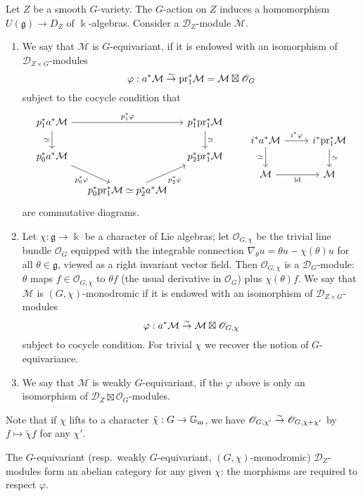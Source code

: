 \documentclass[12pt, a3paper, openany]{book}
\begin{document}
\begin{Definition}{}{}
	Let $Z$ be a smooth $G$-variety. The $G$-action on $Z$ induces a homomorphism $U(\mathfrak{g}) \to D_Z$ of $\Bbbk$-algebras. Consider a $\mathscr{D}_Z$-module $\mathcal{M}$.
	\begin{enumerate}
		\item We say that $\mathcal{M}$ is $G$-equivariant, if it is endowed with an isomorphism of $\mathscr{D}_{Z \times G}$-modules
		\[ \varphi: a^* \mathcal{M} \stackrel{\sim}{\rightarrow} \mathrm{pr}_1^* \mathcal{M} =  \mathcal{M} \boxtimes \mathscr{O}_G \]
		subject to the cocycle condition that
		\[\begin{tikzcd}[column sep=small]
			p_1^* a^* \mathcal{M} \arrow[rr, "{p_1^* \varphi}"] \arrow[d, "\simeq"'] & & p_1^* \mathrm{pr}_1^* \mathcal{M} \arrow[d, "\simeq"] \\
			p_0^* a^* \mathcal{M} \arrow[rd, "{p_0^* \varphi}"'] & & p_2^* \mathrm{pr}_1^* \mathcal{M} \\
			& p_0^* \mathrm{pr}_1^* \mathcal{M} \simeq p_2^* a^* \mathcal{M} \arrow[ru, "{p_2^* \varphi}"'] &
		\end{tikzcd} \qquad \begin{tikzcd}
			i^* a^* \mathcal{M} \arrow[r, "{i^* \varphi}"] \arrow[d, "\simeq"'] & i^* \mathrm{pr}_1^* \mathcal{M} \arrow[d, "\simeq"] \\
			\mathcal{M} \arrow[r, "\identity"'] & \mathcal{M}
		\end{tikzcd}\]
		are commutative diagrams.
		\item Let $\chi: \mathfrak{g} \to \Bbbk$ be a character of Lie algebras; let $\mathscr{O}_{G, \chi}$ be the trivial line bundle $\mathscr{O}_G$ equipped with the integrable connection $\nabla_\theta u = \theta u - \chi(\theta) u$ for all $\theta \in \mathfrak{g}$, viewed as a right invariant vector field. Then $\mathscr{O}_{G, \chi}$ is a $\mathscr{D}_G$-module: $\theta$ maps $f \in \mathscr{O}_{G, \chi}$ to $\theta f$ (the usual derivative in $\mathscr{O}_G$) plus $\chi(\theta) f$. We say that $\mathcal{M}$ is $(G, \chi)$-monodromic if it is endowed with an isomorphism of $\mathscr{D}_{Z \times G}$-modules
		\[ \varphi: a^* \mathcal{M} \stackrel{\sim}{\rightarrow} \mathcal{M} \boxtimes \mathscr{O}_{G, \chi} \]
		subject to cocycle condition. For trivial $\chi$ we recover the notion of $G$-equivariance.
		\item We say that $\mathcal{M}$ is weakly $G$-equivariant, if the $\varphi$ above is only an isomorphism of $\mathscr{D}_Z \boxtimes \mathscr{O}_G$-modules.
	\end{enumerate}
	Note that if $\chi$ lifts to a character $\tilde{\chi}: G \to \mathbb{G}_\mathrm{m}$, we have $\mathscr{O}_{G, \chi'} \stackrel{\sim}{\rightarrow} \mathscr{O}_{G, \chi + \chi'}$ by $f \mapsto \tilde{\chi} f$ for any $\chi'$.

	The $G$-equivariant (resp.\ weakly $G$-equivariant, $(G, \chi)$-monodromic) $\mathscr{D}_Z$-modules form an abelian category for any given $\chi$: the morphisms are required to respect $\varphi$.
\end{Definition}
\end{document}
